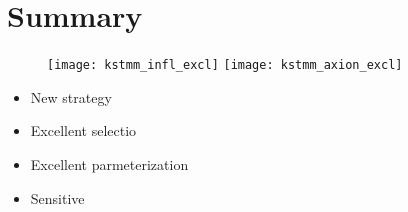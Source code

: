 \section{Summary}



\begin{figure}
  \begin{center}
    \texttt{[image: kstmm\_infl\_excl]}
    \texttt{[image: kstmm\_axion\_excl]}
    \caption[]
    {
    }
    \label{fig:db:excl}
  \end{center}
\end{figure}


%
%

\begin{itemize}
  \item New strategy
  \item Excellent selectio
  \item Excellent parmeterization
  \item Sensitive
\end{itemize}



